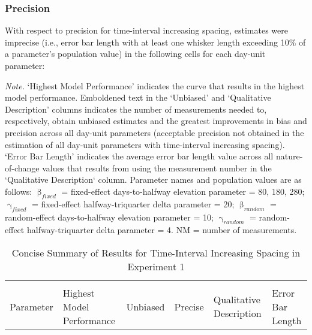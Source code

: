 \documentclass[
12pt, %
twoside,
english]{guelphthesis}
\begin{document}
\hypertarget{precision-time-inc-exp1}{%
\subsubsection{Precision}\label{precision-time-inc-exp1}}

With respect to precision for time-interval increasing spacing, estimates were imprecise (i.e., error bar length with at least one whisker length exceeding 10\% of a parameter's population value) in the following cells for each day-unit parameter:

\begin{landscape}
\begin{ThreePartTable}
\begin{TableNotes}
\item \textit{Note. }`Highest Model Performance' indicates the curve that results in the highest model performance. Emboldened text in the `Unbiased' and `Qualitative Description' columns indicates the number of measurements needed to, respectively, obtain unbiased estimates and the greatest improvements in bias and precision across all day-unit parameters (acceptable precision not obtained in the estimation of all day-unit parameters with time-interval increasing spacing). `Error Bar Length' indicates the average error bar length value across all nature-of-change values that results from using the measurement number in the `Qualitative Description` column. Parameter names and population values are as follows: $\upbeta_{fixed}$ = fixed-effect days-to-halfway elevation parameter = {80, 180, 280}; $\upgamma_{fixed}$ = fixed-effect halfway-triquarter delta parameter = 20; $\upbeta_{random}$ = random-effect days-to-halfway elevation parameter = 10; $\upgamma_{random}$ = random-effect halfway-triquarter delta parameter = 4. NM = number of measurements.
\end{TableNotes}
\begin{longtable}[l]{>{\raggedright\arraybackslash}p{2cm}>{\centering\arraybackslash}p{5cm}>{\centering\arraybackslash}p{2.5cm}>{\centering\arraybackslash}p{3cm}>{\raggedright\arraybackslash}p{6.5cm}>{\centering\arraybackslash}p{3cm}}
\caption{\label{tab:summary-table-time-inc-exp1}Concise Summary of Results for Time-Interval Increasing Spacing in Experiment 1}\\
\toprule
\multicolumn{4}{c}{ } & \multicolumn{2}{c}{Description} \\
\cmidrule(l{3pt}r{3pt}){5-6}
Parameter & Highest Model Performance & Unbiased & Precise & Qualitative Description & Error Bar Length\\

\end{longtable}
\end{ThreePartTable}
\end{landscape}
\end{document}
